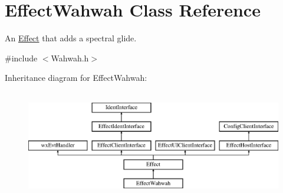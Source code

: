 \hypertarget{class_effect_wahwah}{}\section{Effect\+Wahwah Class Reference}
\label{class_effect_wahwah}


An \hyperlink{class_effect}{Effect} that adds a \textquotesingle{}spectral glide\textquotesingle{}.  




{\ttfamily \#include $<$Wahwah.\+h$>$}

Inheritance diagram for Effect\+Wahwah\+:\begin{figure}[H]
\begin{center}
\leavevmode
\includegraphics[height=4.794520cm]{class_effect_wahwah}
\end{center}
\end{figure}
